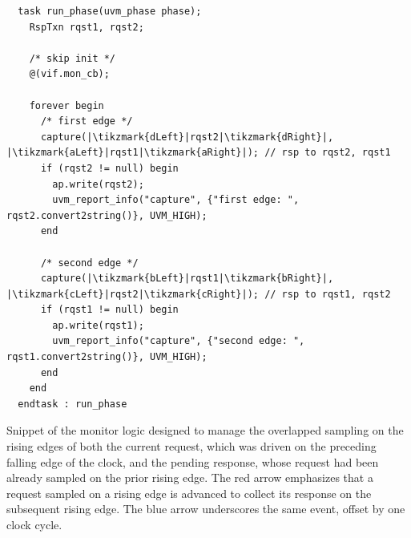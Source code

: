 \begin{listing}
\begin{verbatim}
  task run_phase(uvm_phase phase);
    RspTxn rqst1, rqst2;

    /* skip init */
    @(vif.mon_cb);

    forever begin
      /* first edge */
      capture(|\tikzmark{dLeft}|rqst2|\tikzmark{dRight}|, |\tikzmark{aLeft}|rqst1|\tikzmark{aRight}|); // rsp to rqst2, rqst1
      if (rqst2 != null) begin
        ap.write(rqst2);
        uvm_report_info("capture", {"first edge: ", rqst2.convert2string()}, UVM_HIGH);
      end

      /* second edge */
      capture(|\tikzmark{bLeft}|rqst1|\tikzmark{bRight}|, |\tikzmark{cLeft}|rqst2|\tikzmark{cRight}|); // rsp to rqst1, rqst2
      if (rqst1 != null) begin
        ap.write(rqst1);
        uvm_report_info("capture", {"second edge: ", rqst1.convert2string()}, UVM_HIGH);
      end
    end
  endtask : run_phase
\end{verbatim}
\caption{Snippet of the monitor logic designed to manage the overlapped sampling on the rising edges of both the current request, which was driven on the preceding falling edge of the clock, and the pending response, whose request had been already sampled on the prior rising edge. The red arrow emphasizes that a request sampled on a rising edge is advanced to collect its response on the subsequent rising edge. The blue arrow underscores the same event, offset by one clock cycle.}
\label{list:wrf_mon}
\end{listing}

